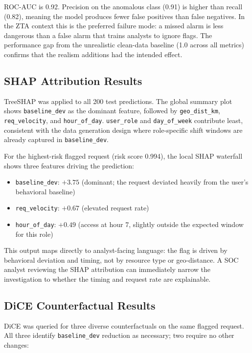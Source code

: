 \documentclass[conference]{IEEEtran}
\begin{document}
ROC-AUC is 0.92. Precision on the anomalous class (0.91) is higher than recall (0.82), meaning the model produces fewer false positives than false negatives. In the ZTA context this is the preferred failure mode: a missed alarm is less dangerous than a false alarm that trains analysts to ignore flags. The performance gap from the unrealistic clean-data baseline (1.0 across all metrics) confirms that the realism additions had the intended effect.

\subsection{SHAP Attribution Results}

TreeSHAP was applied to all 200 test predictions. The global summary plot shows \texttt{baseline\_dev} as the dominant feature, followed by \texttt{geo\_dist\_km}, \texttt{req\_velocity}, and \texttt{hour\_of\_day}. \texttt{user\_role} and \texttt{day\_of\_week} contribute least, consistent with the data generation design where role-specific shift windows are already captured in \texttt{baseline\_dev}.

For the highest-risk flagged request (risk score 0.994), the local SHAP waterfall shows three features driving the prediction:

\begin{itemize}
  \item \texttt{baseline\_dev}: $+3.75$ (dominant; the request deviated heavily from the user's behavioral baseline)
  \item \texttt{req\_velocity}: $+0.67$ (elevated request rate)
  \item \texttt{hour\_of\_day}: $+0.49$ (access at hour 7, slightly outside the expected window for this role)
\end{itemize}

This output maps directly to analyst-facing language: the flag is driven by behavioral deviation and timing, not by resource type or geo-distance. A SOC analyst reviewing the SHAP attribution can immediately narrow the investigation to whether the timing and request rate are explainable.

\subsection{DiCE Counterfactual Results}

DiCE was queried for three diverse counterfactuals on the same flagged request. All three identify \texttt{baseline\_dev} reduction as necessary; two require no other changes:
\end{document}
